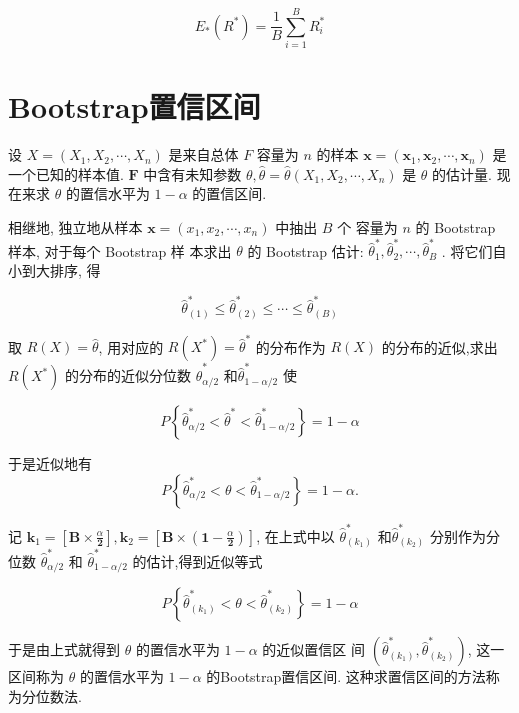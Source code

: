 $$ E_{*}\left(R^{*}\right)=\frac{1}{B} \sum_{i=1}^{B} R_{i}^{*} $$

\section{Bootstrap置信区间}

设 $ X=\left(X_{1}, X_{2}, \cdots, X_{n}\right) $ 是来自总体 $ F $ 容量为 $ n $ 的样本 $ \boldsymbol{x}=\left(\boldsymbol{x}_{1}, \boldsymbol{x}_{2}, \cdots, \boldsymbol{x}_{n}\right) $ 是一个已知的样本值.  $ \boldsymbol{F} $ 中含有未知参数 $ \theta, \hat{\theta}=\hat{\theta}\left(X_{1}, X_{2}, \cdots, X_{n}\right) $ 是 $ \theta $ 的估计量. 现在来求 $ \theta $ 的置信水平为 $ 1-\alpha $ 的置信区间. 

相继地, 独立地从样本 $ \boldsymbol{x}=\left(x_{1}, x_{2}, \cdots, x_{n}\right) $ 中抽出 $ B $ 个 容量为 $ n $ 的 Bootstrap 样本, 对于每个 Bootstrap 样 本求出 $ \theta $ 的 Bootstrap 估计: $ \hat{\theta}_{1}^{*}, \hat{\theta}_{2}^{*}, \cdots, \hat{\theta}_{B}^{*} $ .  将它们自 小到大排序, 得

$$ \hat{\theta}_{(1)}^{*} \leq \hat{\theta}_{(2)}^{*} \leq \cdots \leq \hat{\theta}_{(B)}^{*} $$

取 $ R(X)=\hat{\theta} $, 用对应的 $ R\left(X^{*}\right)=\hat{\theta}^{*} $ 的分布作为 $ R(X) $ 的分布的近似,求出 $ R\left(X^{*}\right) $ 的分布的近似分位数 $ \hat{\theta}_{\alpha / 2}^{*} $ 和$ \hat{\theta}_{1-\alpha / 2}^{*} $ 使

$$ P\left\{\hat{\theta}_{\alpha / 2}^{*}<\hat{\theta}^{*}<\hat{\theta}_{1-\alpha / 2}^{*}\right\}=1-\alpha $$

于是近似地有
$$
P\left\{\hat{\theta}_{\alpha / 2}^{*}<\theta<\hat{\theta}_{1-\alpha / 2}^{*}\right\}=1-\alpha .
$$

记 $ \boldsymbol{k}_{1}=\left[\boldsymbol{B} \times \frac{\alpha}{\mathbf{2}}\right], \boldsymbol{k}_{2}=\left[\boldsymbol{B} \times\left(\mathbf{1}-\frac{\alpha}{\mathbf{2}}\right)\right] $, 在上式中以 $ \hat{\theta}_{\left(k_{1}\right)}^{*} $ 和$ \hat{\theta}_{\left(k_{2}\right)}^{*} $ 分别作为分位数 $ \hat{\theta}_{\alpha / 2}^{*} $ 和 $ \hat{\theta}_{1-\alpha / 2}^{*} $ 的估计,得到近似等式

$$ P\left\{\hat{\theta}_{\left(k_{1}\right)}^{*}<\theta<\hat{\theta}_{\left(k_{2}\right)}^{*}\right\}=1-\alpha $$

于是由上式就得到 $ \theta $ 的置信水平为 $ 1-\alpha $ 的近似置信区 间 $ \left(\hat{\theta}_{\left(k_{1}\right)}^{*}, \hat{\theta}_{\left(k_{2}\right)}^{*}\right) $, 这一区间称为 $ \theta $ 的置信水平为 $ 1-\alpha $ 的Bootstrap置信区间. 这种求置信区间的方法称为分位数法. 

